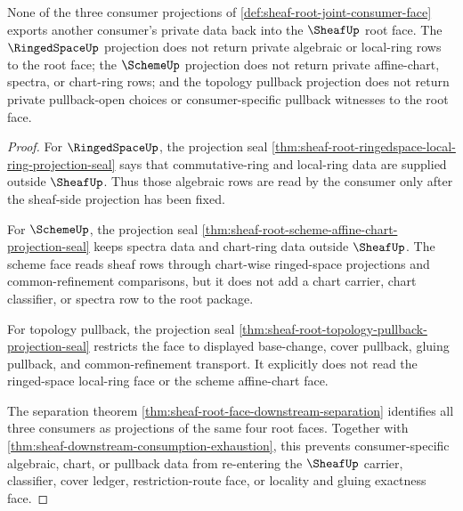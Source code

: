 \begin{theorem}
\label{thm:sheaf-root-joint-consumer-face-noninterference}
None of the three consumer projections of \autoref{def:sheaf-root-joint-consumer-face} exports another consumer's private data back into the $\SheafUp$ root face. The $\RingedSpaceUp$ projection does not return private algebraic or local-ring rows to the root face; the $\SchemeUp$ projection does not return private affine-chart, spectra, or chart-ring rows; and the topology pullback projection does not return private pullback-open choices or consumer-specific pullback witnesses to the root face.
\end{theorem}
\begin{proof}
For $\RingedSpaceUp$, the projection seal \autoref{thm:sheaf-root-ringedspace-local-ring-projection-seal} says that commutative-ring and local-ring data are supplied outside $\SheafUp$. Thus those algebraic rows are read by the consumer only after the sheaf-side projection has been fixed.

For $\SchemeUp$, the projection seal \autoref{thm:sheaf-root-scheme-affine-chart-projection-seal} keeps spectra data and chart-ring data outside $\SheafUp$. The scheme face reads sheaf rows through chart-wise ringed-space projections and common-refinement comparisons, but it does not add a chart carrier, chart classifier, or spectra row to the root package.

For topology pullback, the projection seal \autoref{thm:sheaf-root-topology-pullback-projection-seal} restricts the face to displayed base-change, cover pullback, gluing pullback, and common-refinement transport. It explicitly does not read the ringed-space local-ring face or the scheme affine-chart face.

The separation theorem \autoref{thm:sheaf-root-face-downstream-separation} identifies all three consumers as projections of the same four root faces. Together with \autoref{thm:sheaf-downstream-consumption-exhaustion}, this prevents consumer-specific algebraic, chart, or pullback data from re-entering the $\SheafUp$ carrier, classifier, cover ledger, restriction-route face, or locality and gluing exactness face.
\end{proof}

